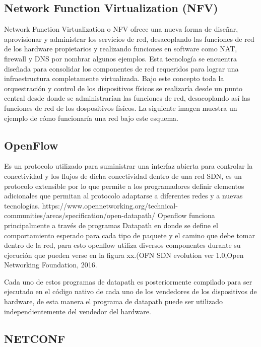 \subsection{Network Function Virtualization (NFV)}
\label{sec:Network Function Virtualization (NFV)}

Network Function Virtualization o NFV ofrece una nueva forma de diseñar, aprovisionar y administrar los servicios de red, desacoplando las funciones de red de los hardware propietarios y realizando funciones en software como NAT, firewall y DNS por nombrar algunos ejemplos. Esta tecnología se encuentra diseñada para consolidar los componentes de red requeridos para lograr una infraestructura completamente virtualizada.
Bajo este concepto toda la orquestración y control de los dispositivos físicos se realizaría desde un punto central desde donde se administrarían las funciones de red, desacoplando así las funciones de red de los dospositivos físicos. La siguiente imagen muestra un ejemplo de cómo funcionaría una red bajo este esquema.


\subsection{OpenFlow}
\label{sec:OpenFlow}

Es un protocolo utilizado para suministrar una interfaz abierta para controlar la conectividad y los flujos de dicha conectividad dentro de una red SDN, es un protocolo extensible por lo que permite a los programadores definir elementos adicionales que permitan al protocolo adaptarse a diferentes redes y a nuevas tecnologías. https://www.opennetworking.org/technical-communities/areas/specification/open-datapath/
Openflow funciona principalmente a través de programas Datapath en donde se define el comportamiento esperado para cada tipo de paquete y el camino que debe tomar dentro de la red, para esto openflow utiliza diversos componentes durante su ejecución que pueden verse en la figura xx.(OFN SDN evolution ver 1.0,Open Networking Foundation, 2016.

Cada uno de estos programas de datapath es posteriormente compilado para ser ejecutado en el código nativo de cada uno de los vendedores de los dispositivos de hardware, de esta manera el programa de datapath puede ser utilizado independientemente del vendedor del hardware.


\subsection{NETCONF}
\label{sec:NETCONF}

